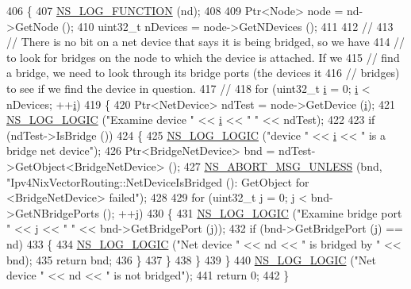 \begin{DoxyCode}
406 \{
407   \hyperlink{log-macros-disabled_8h_a90b90d5bad1f39cb1b64923ea94c0761}{NS\_LOG\_FUNCTION} (nd);
408 
409   Ptr<Node> node = nd->GetNode ();
410   uint32\_t nDevices = node->GetNDevices ();
411 
412   \textcolor{comment}{//}
413   \textcolor{comment}{// There is no bit on a net device that says it is being bridged, so we have}
414   \textcolor{comment}{// to look for bridges on the node to which the device is attached.  If we}
415   \textcolor{comment}{// find a bridge, we need to look through its bridge ports (the devices it}
416   \textcolor{comment}{// bridges) to see if we find the device in question.}
417   \textcolor{comment}{//}
418   \textcolor{keywordflow}{for} (uint32\_t \hyperlink{bernuolliDistribution_8m_a6f6ccfcf58b31cb6412107d9d5281426}{i} = 0; \hyperlink{bernuolliDistribution_8m_a6f6ccfcf58b31cb6412107d9d5281426}{i} < nDevices; ++\hyperlink{bernuolliDistribution_8m_a6f6ccfcf58b31cb6412107d9d5281426}{i})
419     \{
420       Ptr<NetDevice> ndTest = node->GetDevice (\hyperlink{bernuolliDistribution_8m_a6f6ccfcf58b31cb6412107d9d5281426}{i});
421       \hyperlink{group__logging_ga88acd260151caf2db9c0fc84997f45ce}{NS\_LOG\_LOGIC} (\textcolor{stringliteral}{"Examine device "} << \hyperlink{bernuolliDistribution_8m_a6f6ccfcf58b31cb6412107d9d5281426}{i} << \textcolor{stringliteral}{" "} << ndTest);
422 
423       \textcolor{keywordflow}{if} (ndTest->IsBridge ())
424         \{
425           \hyperlink{group__logging_ga88acd260151caf2db9c0fc84997f45ce}{NS\_LOG\_LOGIC} (\textcolor{stringliteral}{"device "} << \hyperlink{bernuolliDistribution_8m_a6f6ccfcf58b31cb6412107d9d5281426}{i} << \textcolor{stringliteral}{" is a bridge net device"});
426           Ptr<BridgeNetDevice> bnd = ndTest->GetObject<BridgeNetDevice> ();
427           \hyperlink{group__fatal_ga0bd3f62c55e7347ff814572f3aaa3864}{NS\_ABORT\_MSG\_UNLESS} (bnd, \textcolor{stringliteral}{"Ipv4NixVectorRouting::NetDeviceIsBridged ():
       GetObject for <BridgeNetDevice> failed"});
428 
429           \textcolor{keywordflow}{for} (uint32\_t j = 0; j < bnd->GetNBridgePorts (); ++j)
430             \{
431               \hyperlink{group__logging_ga88acd260151caf2db9c0fc84997f45ce}{NS\_LOG\_LOGIC} (\textcolor{stringliteral}{"Examine bridge port "} << j << \textcolor{stringliteral}{" "} << bnd->GetBridgePort (j));
432               \textcolor{keywordflow}{if} (bnd->GetBridgePort (j) == nd)
433                 \{
434                   \hyperlink{group__logging_ga88acd260151caf2db9c0fc84997f45ce}{NS\_LOG\_LOGIC} (\textcolor{stringliteral}{"Net device "} << nd << \textcolor{stringliteral}{" is bridged by "} << bnd);
435                   \textcolor{keywordflow}{return} bnd;
436                 \}
437             \}
438         \}
439     \}
440   \hyperlink{group__logging_ga88acd260151caf2db9c0fc84997f45ce}{NS\_LOG\_LOGIC} (\textcolor{stringliteral}{"Net device "} << nd << \textcolor{stringliteral}{" is not bridged"});
441   \textcolor{keywordflow}{return} 0;
442 \}
\end{DoxyCode}


